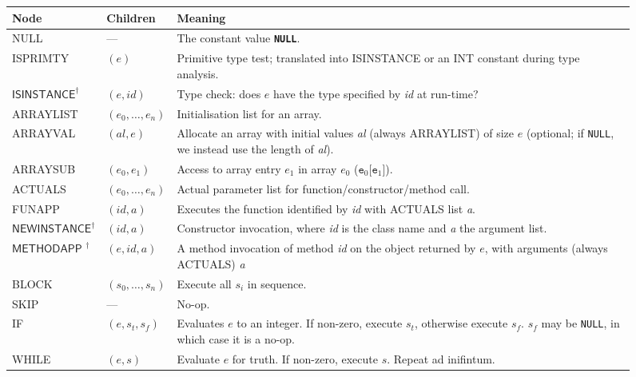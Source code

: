 \documentclass[11pt,a4paper]{article}
\newcommand{\Cpp}[1]{\textcolor{dcyan}{\texttt{#1}}}
\newcommand{\Ckw}[1]{\textbf{\texttt{#1}}}
\begin{document}
\begin{figure}[h]
\begin{tabular}{|p{2.8cm}|p{2cm}|p{11cm}|}
\hline
\textbf{Node} & \textbf{Children} & \textbf{Meaning} \\
\hline
\hline
\textsf{NULL}		& ---		& The constant value \Ckw{NULL}.\\
\hline
\textsf{ISPRIMTY}	& $(e)$		& Primitive type test; translated into \textsf{ISINSTANCE} or an \textsf{INT} constant during type analysis. \\
\hline
$\textsf{ISINSTANCE}^{\dagger}$	& $(e, \textit{id})$ & Type check: does $e$ have the type specified by \textit{id} at run-time? \\
\hline
\textsf{ARRAYLIST }	& $(e_0, \ldots, e_n)$ & Initialisation list for an array. \\
\hline
\textsf{ARRAYVAL}	& $(\textit{al}, e)$ & Allocate an array with initial values \textit{al} (always \textsf{ARRAYLIST}) of size $e$ (optional; if \Cpp{NULL}, we instead use the length of \textit{al}). \\
\hline
\textsf{ARRAYSUB}	& $(e_0, e_1)$	& Access to array entry $e_1$ in array $e_0$ ($\texttt{e}_0$[$\texttt{e}_1$]). \\
\hline
\textsf{ACTUALS}	& $(e_0, \ldots, e_n)$ & Actual parameter list for function/constructor/method call. \\
\hline
\textsf{FUNAPP}		& $(\textit{id}, \textit{a})$ & Executes the function identified by \textit{id} with \textsf{ACTUALS} list \textit{a}. \\
\hline
$\textsf{NEWINSTANCE}^\dagger$	&$(\textit{id}, \textit{a})$ & Constructor invocation, where \textit{id} is the class name and \textit{a} the argument list.\\
\hline
$\textsf{METHODAPP  }^\dagger$	&$(e, \textit{id}, \textit{a})$ & A method invocation of method \textit{id} on the object returned by $e$, with arguments (always \textsf{ACTUALS}) \textit{a} \\
\hline
\textsf{BLOCK}		& $(s_0, \ldots, s_n)$ & Execute all $s_i$ in sequence. \\
\hline
\textsf{SKIP} 		& ---		& No-op. \\
\hline
\textsf{IF}		& $(e, s_t, s_f)$ & Evaluates $e$ to an integer.  If non-zero, execute $s_t$, otherwise execute $s_f$.  $s_f$ may be \Cpp{NULL}, in which case it is a no-op. \\
\hline
\textsf{WHILE}		& $(e, s)$	& Evaluate $e$ for truth.  If non-zero, execute $s$.  Repeat ad inifintum. \\

\end{tabular}
\end{figure}
\end{document}
